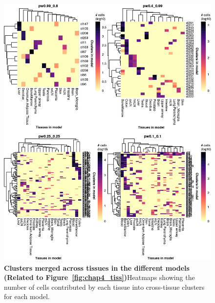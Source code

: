 \begin{figure}[ht!] 
\centering
\includegraphics[width=1.0\textwidth]{Appendix3/Figs/appB_tissue_clustrelations_HumanAtlas.png} %
\caption[Clusters merged across tissues in the different models]{\textbf{Clusters merged across tissues in the different models (Related to Figure~\ref{fig:chap4_tiss})}\newline Heatmaps showing the number of cells contributed by each tissue into cross-tissue clusters for each model.}
\label{fig:appC_tissrel}
\end{figure}


